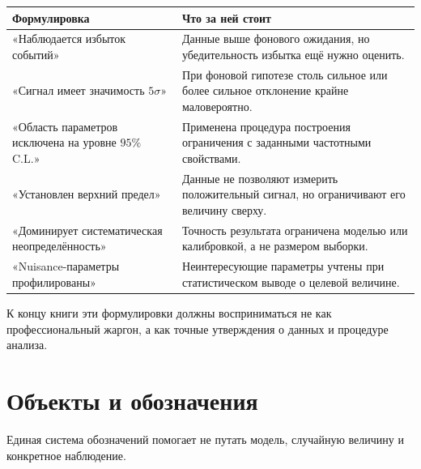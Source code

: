 \documentclass[
  russian,
  letterpaper,
]{scrbook}
\newcounter{none} %
\begin{document}
{\def\LTcaptype{none} %
\begin{longtable}[]{@{}
  >{\raggedright\arraybackslash}p{}
  >{\raggedright\arraybackslash}p{}@{}}
\toprule\noalign{}
\begin{minipage}[b]{\linewidth}\raggedright
Формулировка
\end{minipage} & \begin{minipage}[b]{\linewidth}\raggedright
Что за ней стоит
\end{minipage} \\
\midrule\noalign{}
\endhead
\bottomrule\noalign{}
\endlastfoot
«Наблюдается избыток событий» & Данные выше фонового ожидания, но
убедительность избытка ещё нужно оценить. \\
«Сигнал имеет значимость \(5\sigma\)» & При фоновой гипотезе столь
сильное или более сильное отклонение крайне маловероятно. \\
«Область параметров исключена на уровне \(95\%\) C.L.» & Применена
процедура построения ограничения с заданными частотными свойствами. \\
«Установлен верхний предел» & Данные не позволяют измерить положительный
сигнал, но ограничивают его величину сверху. \\
«Доминирует систематическая неопределённость» & Точность результата
ограничена моделью или калибровкой, а не размером выборки. \\
«Nuisance-параметры профилированы» & Неинтересующие параметры учтены при
статистическом выводе о целевой величине. \\
\end{longtable}
}

К концу книги эти формулировки должны восприниматься не как
профессиональный жаргон, а как точные утверждения о данных и процедуре
анализа.

\section{Объекты и
обозначения}\label{ux43eux431ux44aux435ux43aux442ux44b-ux438-ux43eux431ux43eux437ux43dux430ux447ux435ux43dux438ux44f}

Единая система обозначений помогает не путать модель, случайную величину
и конкретное наблюдение.
\end{document}

